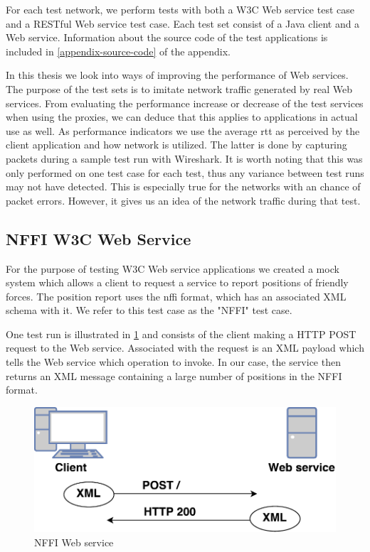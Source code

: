For each test network, we perform tests with both a W3C Web service test case
and a RESTful Web service test case. Each test set consist of a Java client and
a Web service. Information about the source code of the test applications is
included in \cref{appendix-source-code} of the appendix.

In this thesis we look into ways of improving the performance of Web services.
The purpose of the test sets is to imitate network traffic generated by real Web
services. From evaluating the performance increase or decrease of the test
services when using the proxies, we can deduce that this applies to applications
in actual use as well. As performance indicators we use the average \gls{rtt} as
perceived by the client application and how network is utilized. The latter is
done by capturing packets during a sample test run with Wireshark. It is worth
noting that this was only performed on one test case for each test, thus any
variance between test runs may not have detected. This is especially true for
the networks with an chance of packet errors. However, it gives us an idea of
the network traffic during that test.

\subsection{NFFI W3C Web Service}

For the purpose of testing W3C Web service applications we created a mock system
which allows a client to request a service to report positions of friendly
forces. The position report uses the \gls{nffi} format, which has an associated
XML schema with it. We refer to this test case as the "NFFI" test case.

One test run is illustrated in \cref{figure-nffi-flow} and consists of the
client making a HTTP POST request to the Web service. Associated with the
request is an XML payload which tells the Web service which operation to invoke.
In our case, the service then returns an XML message containing a large number
of positions in the NFFI format.

\begin{figure}[h]
\centering
\includegraphics[scale=0.6]{images/nffi_flow.pdf}
\caption{NFFI Web service}
\label{figure-nffi-flow}
\end{figure}


